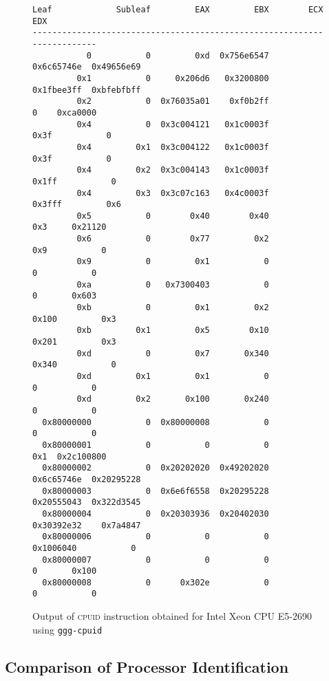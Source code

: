 \documentclass[a4paper,10pt,oneside,unicode]{article}
\newcommand{\cpuid}{\textsc{cpuid} }
\begin{document}
\begin{figure}[htbp]
\centering
\begin{verbatim}
Leaf             Subleaf         EAX         EBX        ECX          EDX
------------------------------------------------------------------------
           0           0         0xd  0x756e6547  0x6c65746e  0x49656e69
         0x1           0     0x206d6   0x3200800  0x1fbee3ff  0xbfebfbff
         0x2           0  0x76035a01    0xf0b2ff           0    0xca0000
         0x4           0  0x3c004121   0x1c0003f        0x3f           0
         0x4         0x1  0x3c004122   0x1c0003f        0x3f           0
         0x4         0x2  0x3c004143   0x1c0003f       0x1ff           0
         0x4         0x3  0x3c07c163   0x4c0003f      0x3fff         0x6
         0x5           0        0x40        0x40         0x3     0x21120
         0x6           0        0x77         0x2         0x9           0
         0x9           0         0x1           0           0           0
         0xa           0   0x7300403           0           0       0x603
         0xb           0         0x1         0x2       0x100         0x3
         0xb         0x1         0x5        0x10       0x201         0x3
         0xd           0         0x7       0x340       0x340           0
         0xd         0x1         0x1           0           0           0
         0xd         0x2       0x100       0x240           0           0
  0x80000000           0  0x80000008           0           0           0
  0x80000001           0           0           0         0x1  0x2c100800
  0x80000002           0  0x20202020  0x49202020  0x6c65746e  0x20295228
  0x80000003           0  0x6e6f6558  0x20295228  0x20555043  0x322d3545
  0x80000004           0  0x20303936  0x20402030  0x30392e32    0x7a4847
  0x80000006           0           0           0   0x1006040           0
  0x80000007           0           0           0           0       0x100
  0x80000008           0      0x302e           0           0           0
\end{verbatim}

    \caption{Output of \cpuid instruction obtained for Intel\textregistered{} Xeon\textregistered{} CPU E5-2690 using \texttt{ggg-cpuid}~\cite{ggg-cpuid}}\label{fig:x86-cpuid}
\end{figure}

\subsection{Comparison of Processor Identification}
\end{document}
